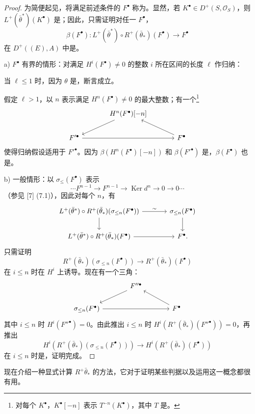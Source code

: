 \begin{proof}
为简便起见，将满足前述条件的 $F^\bullet$ 称为。显然，若 $K^\bullet\in D^+(S,\mathcal O_S)$，则 $L^+(\bar\theta^*)(K^\bullet)$
是；因此，只需证明对任一 $F^\bullet$，
\[
\beta(F^\bullet):L^+(\bar\theta^*)\circ R^+(\bar\theta_*)(F^\bullet)\longrightarrow F^\bullet
\]
在 $D^+((E),A)$ 中是。

a) $F^\bullet$ 有界的情形：对满足 $H^i(F^\bullet)\ne0$ 的整数 $i$ 所在区间的长度 $\ell$ 作归纳：

当 $\ell\leq1$ 时，因为 $\theta$ 是，断言成立。

假定 $\ell>1$，以 $n$ 表示满足 $H^n(F^\bullet)\ne0$ 的最大整数；有一个\footnote{对每个 $K^\bullet$，$K^\bullet[-n]$ 表示 $T^{-n}(K^\bullet)$，其中 $T$ 是。}
\[
\begin{tikzcd}[column sep=large]
& H^n(F^\bullet)[-n]\arrow[dl] &\\
F'^\bullet\arrow[rr] &&F^\bullet\arrow[ul]
\end{tikzcd}
\]
使得归纳假设适用于 $F'^\bullet$。因为 $\beta(H^n(F^\bullet)[-n])$ 和 $\beta(F'^\bullet)$ 是，$\beta(F^\bullet)$ 也是。

b) 一般情形：以 $\sigma_{\leq}(F^\bullet)$ 表示
\[
\cdots F^{n-1}\longrightarrow F^{n-1}\longrightarrow\operatorname{Ker}d^n
\longrightarrow0\longrightarrow0\cdots
\]
（参见 [7] (7.1)），因此对每个 $n$，有
\[
\begin{tikzcd}[column sep=large]
L^+(\bar\theta^*)\circ R^+(\bar\theta_*)(\sigma_{\leq n}(F^\bullet)) \arrow[r,"\sim"] \arrow[d] & \sigma_{\leq n}(F^\bullet)\arrow[d]\\
L^+(\bar\theta^*)\circ R^+(\bar\theta_*)(F^\bullet)\arrow[r] & F^\bullet.
\end{tikzcd}
\]
只需证明
\[
R^+(\bar\theta_*)(\sigma_{\leq n}(F^\bullet))\longrightarrow R^+(\bar\theta_*)(F^\bullet)
\]
在 $i\leq n$ 时在 $H^i$ 上诱导。现在有一个三角：
\[
\begin{tikzcd}[column sep=large]
&F''^\bullet\arrow[dl]&\\
\sigma_{\leq n}(F^\bullet)\arrow[rr]&&F^\bullet\arrow[ul]
\end{tikzcd}
\]
其中 $i\leq n$ 时 $H^i(F''^\bullet)=0$。由此推出 $i\leq n$ 时 $H^i(R^+(\bar\theta_*)(F''^\bullet))=0$，再推出
\[
H^i(R^+(\bar\theta_*)(\sigma_{\leq n}(F^\bullet)))\longrightarrow H^i(R^+(\bar\theta_*)(F^\bullet))
\]
在 $i\leq n$ 时是，证明完成。
\end{proof}
现在介绍一种显式计算 $R^+\bar\theta_*$ 的方法，它对于证明某些判据以及运用这一概念都很有用。

